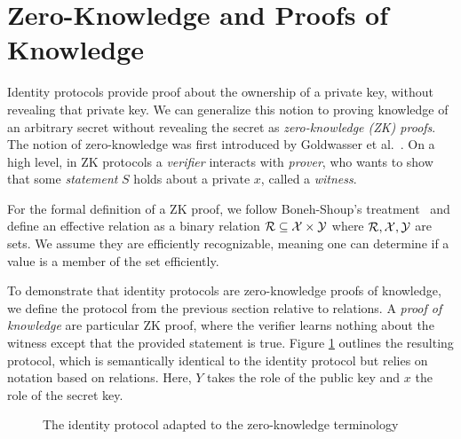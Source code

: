 \section{Zero-Knowledge and Proofs of Knowledge}
\label{sec:zknowledge}
Identity protocols provide proof about the ownership of a private key, without revealing that private key.
We can generalize this notion to proving knowledge of an arbitrary secret without revealing the secret as \emph{zero-knowledge (ZK) proofs}. 
The notion of zero-knowledge was first introduced by Goldwasser et al.~\cite{goldwasser1989knowledge}.
On a high level, in ZK protocols a \emph{verifier} interacts with \emph{prover}, who wants to show that some \emph{statement} $S$ holds about a private $x$, called a \emph{witness}. 

For the formal definition of a ZK proof, we follow Boneh-Shoup's treatment~\cite{BonehShoupBook} and define an effective relation as a binary relation ${\cal R} \subseteq {\cal X} \times {\cal Y}$  where ${\cal R}, {\cal X},{\cal Y}$ are sets.
We assume they are efficiently recognizable, meaning one can determine if a value is a member of the set efficiently.

To demonstrate that identity protocols are zero-knowledge proofs of knowledge, we define the protocol from the previous section relative to relations.
A \emph{proof of knowledge} are particular ZK proof, where the verifier learns nothing about the witness except that the provided statement is true.
Figure \ref{fig:sigmaid} outlines the resulting protocol, which is semantically identical to the identity protocol but relies on notation based on relations.
Here, $Y$ takes the role of the public key and $x$ the role of the secret key.

\begin{figure}[h]
\centering


\caption{The identity protocol adapted to the zero-knowledge terminology}
\label{fig:sigmaid}
\end{figure}

